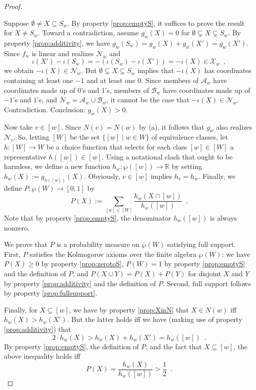 \documentclass[12pt]{article}
\theoremstyle{definition}
\begin{document}
\begin{proof}
\begin{enumerate}
    Suppose $\emptyset\neq X\subseteq S_w$. By property
    \ref{prop:emptyS}, it suffices to prove the result for $X\neq
    S_w$. Toward a contradiction, assume $g_w(X)=0$ for
    $\emptyset\subsetneq X\subsetneq S_w$.  By property
    \ref{prop:additivity}, we have
    $g_w(S_w)=g_w(X)+g_w(X')=g_w(X')$.  Since
    $f_w$ is linear and realizes $\mathcal{N}_w$ and
    \[
    \iota(X')-\iota(S_w) = -(\iota(S_w)-\iota(X')) =
    -\iota(X)\in\mathcal{X}_w\enspace,
    \]
    we obtain $-\iota(X)\in\mathcal{N}_w$.  But
    $\emptyset\subsetneq X\subsetneq S_w$ implies that $-\iota(X)$
    has coordinates containing at least one $-1$ and at least one $0$.
    Since members of $\mathcal{A}_w$ have coordinates made up of
    $0$'s and $1$'s, members of $\mathcal{B}_w$ have coordinates
    made up of $-1$'s and $1$'s, and
    $\mathcal{N}_w=\mathcal{A}_w \cup \mathcal{B}_w$, it
    cannot be the case that $-\iota(X)\in\mathcal{N}_w$.
    Contradiction.  Conclusion: $g_w(X)>0$.
  \end{enumerate}

  Now take $v\in[w]$.  Since $N(v)=N(w)$ by (a), it follows that $g_w$
  also realizes $\mathcal{N}_{v}$.  So, letting $[W]$ be the set
  $\{[w]\mid w\in W\}$ of equivalence classes, let $h:[W]\to W$ be a
  choice function that selects for each class $[w]\in[W]$ a
  representative $h([w])\in[w]$. Using a notational clash that ought
  to be harmless, we define a new function $h_w:\wp([w])\to\mathbb{R}$
  by setting $h_w(X):=g_{h([w])}(X)$.  Obviously, $v\in[w]$ implies
  $h_{v}=h_w$.  Finally, we define $P:\wp(W)\to[0,1]$ by
  \[
  P(X):= \sum_{[w]\in[W]} \frac {h_w(X\cap[w])}
  {h_w([w])}\enspace.
  \]
  Note that by property \ref{prop:emptyS}, the denominator
  $h_w([w])$ is always nonzero.

  We prove that $P$ is a probability measure on $\wp(W)$ satisfying
  full support. First, $P$ satisfies the Kolmogorov axioms over the
  finite algebra $\wp(W)$: we have $P(X)\geq 0$ by property
  \ref{prop:zerotoS}, $P(W)=1$ by property \ref{prop:emptyS} and the
  definition of $P$, and $P(X\cup Y)=P(X)+P(Y)$ for disjoint
  $X$ and $Y$ by property \ref{prop:additivity} and the definition of
  $P$.  Second, full support follows by property
  \ref{prop:fullsupport}.

  Finally, for $X\subseteq[w]$, we have by property \ref{prop:XinN}
  that $X\in N(w)$ iff $h_w(X)>h_w(X')$.  But the latter
  holds iff we have (making use of property \ref{prop:additivity})
  that
  \[
  2\cdot h_w(X)>h_w(X)+h_w(X')=h_w([w])\enspace.
  \]
  By property \ref{prop:emptyS}, the definition of $P$, and the fact
  that $X\subseteq[w]$, the above inequality holds iff
  \[
  P(X)=\frac{h_w(X)}{h_w([w])}>\textstyle \frac
  12\enspace.
  \]
\end{proof}
\end{document}
